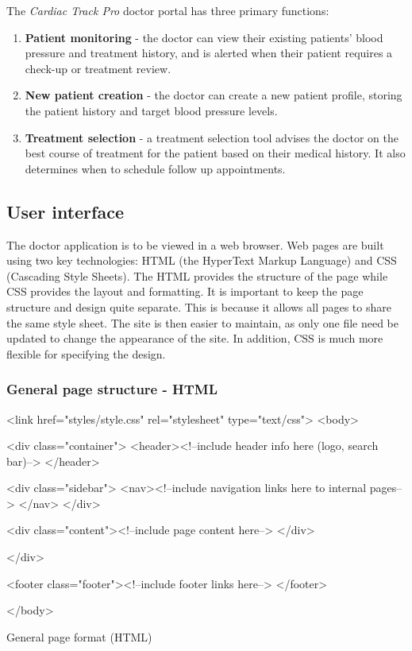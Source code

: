\documentclass[11pt]{article}
\begin{document}
The \textit{Cardiac Track Pro} doctor portal has three primary functions:
\begin{enumerate}
\item \textbf{Patient monitoring} - the doctor can view their existing patients' blood pressure and treatment history, and is alerted when their patient requires a check-up or treatment review.
\item \textbf{New patient creation} - the doctor can create a new patient profile, storing the patient history and target blood pressure levels.
\item \textbf{Treatment selection} - a treatment selection tool advises the doctor on the best course of treatment for the patient based on their medical history. It also determines when to schedule follow up appointments.
\end{enumerate}

\subsection{User interface}

The doctor application is to be viewed in a web browser. Web pages are built using two key technologies: HTML (the HyperText Markup Language) and CSS (Cascading Style Sheets). The HTML provides the structure of the page while CSS provides the layout and formatting. It is important to keep the page structure and design quite separate. This is because it allows all pages to share the same style sheet. The site is then easier to maintain, as only one file need be updated to change the appearance of the site.  In addition, CSS is much more flexible for specifying the design.

\subsubsection{General page structure - HTML}


\begin{code}[ht]
\begin{html}
<link href="styles/style.css" rel="stylesheet" type="text/css">
<body>

<div class="container">
  	<header><!--include header info here (logo, search bar)-->
    </header>
    
    <div class="sidebar">
    <nav><!--include navigation links here to internal pages-->
    </nav>
    </div>

    <div class="content"><!--include page content here-->
    </div>
  	
</div>

<footer class="footer"><!--include footer links here-->
	</footer>

</body>
\end{html}
\caption{General page format (HTML)}
\label{code:htmlGeneral}
\end{code}
\end{document}

